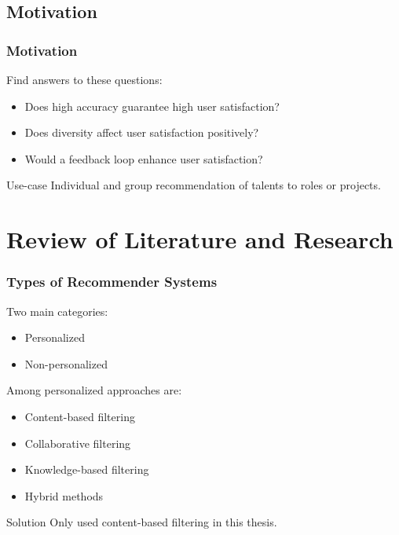 \documentclass{beamer}
\begin{document}
\subsection{Motivation}
\begin{frame} 
\frametitle{Motivation} 
Find answers to these questions:
\begin{itemize}
	\item Does high accuracy guarantee high user satisfaction?
	\item Does diversity affect user satisfaction positively?
	\item Would a feedback loop enhance user satisfaction?
\end{itemize} 
    \begin{block}{Use-case}
    	Individual and group recommendation of talents to roles or projects.  
\end{block}
\end{frame}

\section{Review of Literature and Research}
\begin{frame} 
\frametitle{Types of Recommender Systems} 
Two main categories:
\begin{itemize}
	\item Personalized
	\item Non-personalized
\end{itemize} 
Among personalized approaches are:
\begin{itemize}
	\item Content-based filtering
	\item Collaborative filtering
	\item Knowledge-based filtering
	\item Hybrid methods
\end{itemize} 
   \begin{alertblock}{Solution}
	Only used content-based filtering in this thesis. 
\end{alertblock}
\end{frame}
\end{document}
